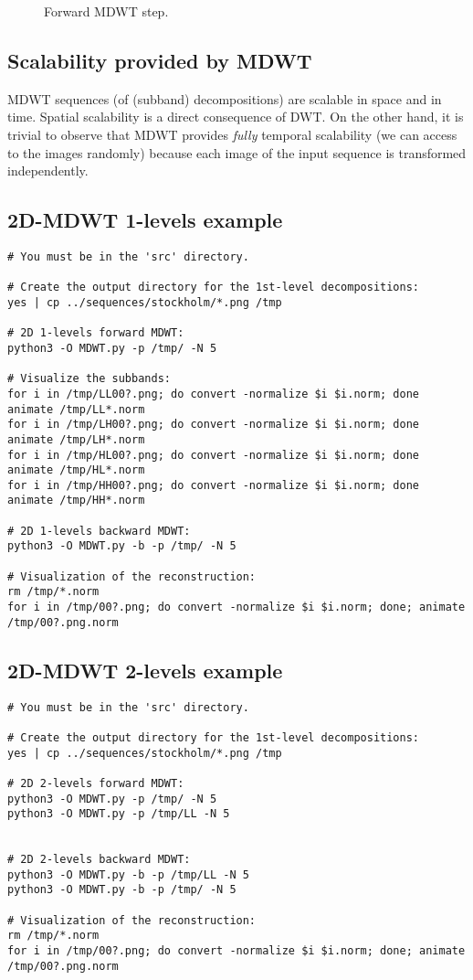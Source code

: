\begin{figure}
\centering
{}
\caption{Forward MDWT step.}
\end{figure}



\subsection{Scalability provided by MDWT}
MDWT sequences (of (subband) decompositions) are scalable in space and
in time. Spatial scalability is a direct consequence of DWT. On the other
hand, it is trivial to observe that MDWT provides \emph{fully}
temporal scalability (we can access to the images randomly) because
each image of the input sequence is transformed independently.

\subsection{2D-MDWT 1-levels example}
\begin{verbatim}
# You must be in the 'src' directory.

# Create the output directory for the 1st-level decompositions:
yes | cp ../sequences/stockholm/*.png /tmp

# 2D 1-levels forward MDWT:
python3 -O MDWT.py -p /tmp/ -N 5

# Visualize the subbands:
for i in /tmp/LL00?.png; do convert -normalize $i $i.norm; done
animate /tmp/LL*.norm
for i in /tmp/LH00?.png; do convert -normalize $i $i.norm; done
animate /tmp/LH*.norm
for i in /tmp/HL00?.png; do convert -normalize $i $i.norm; done
animate /tmp/HL*.norm
for i in /tmp/HH00?.png; do convert -normalize $i $i.norm; done
animate /tmp/HH*.norm

# 2D 1-levels backward MDWT:
python3 -O MDWT.py -b -p /tmp/ -N 5

# Visualization of the reconstruction:
rm /tmp/*.norm
for i in /tmp/00?.png; do convert -normalize $i $i.norm; done; animate /tmp/00?.png.norm
\end{verbatim}

\subsection{2D-MDWT 2-levels example}
\begin{verbatim}
# You must be in the 'src' directory.

# Create the output directory for the 1st-level decompositions:
yes | cp ../sequences/stockholm/*.png /tmp

# 2D 2-levels forward MDWT:
python3 -O MDWT.py -p /tmp/ -N 5
python3 -O MDWT.py -p /tmp/LL -N 5


# 2D 2-levels backward MDWT:
python3 -O MDWT.py -b -p /tmp/LL -N 5
python3 -O MDWT.py -b -p /tmp/ -N 5

# Visualization of the reconstruction:
rm /tmp/*.norm
for i in /tmp/00?.png; do convert -normalize $i $i.norm; done; animate /tmp/00?.png.norm
\end{verbatim}

